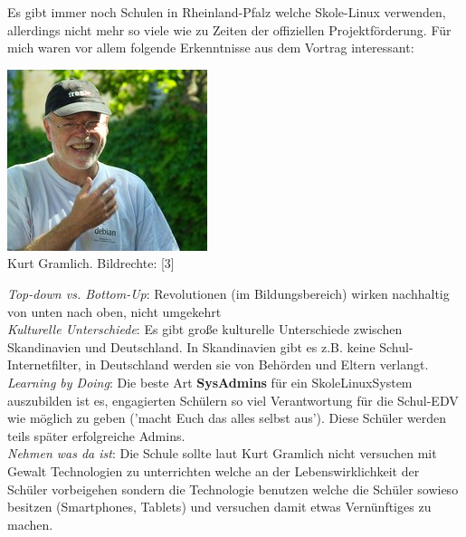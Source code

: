 \documentclass[10pt,a4paper,ngerman,twoside]{article} %
\begin{document}
\begin{multicols}{3}
Es gibt immer noch Schulen in Rheinland-Pfalz welche Skole-Linux verwenden, allerdings nicht mehr so viele wie zu Zeiten der offiziellen Projektförderung. Für mich waren vor allem folgende Erkenntnisse aus dem Vortrag interessant:

\begin{center}
\includegraphics[width=\linewidth]{chemnitz/chemnitz-kurt.jpg} \\
\footnotesize{Kurt Gramlich. Bildrechte: [3]}
\end{center}

\textit{Top-down vs. Bottom-Up}: Revolutionen (im Bildungsbereich) wirken nachhaltig von unten nach oben, nicht umgekehrt \\

\textit{Kulturelle Unterschiede}: Es gibt große kulturelle Unterschiede zwischen Skandinavien und Deutschland. In Skandinavien gibt es z.B. keine Schul-Internetfilter, in Deutschland werden sie von Behörden und Eltern verlangt. \\

\textit{Learning by Doing}: Die beste Art \textbf{SysAdmins} für ein SkoleLinuxSystem auszubilden ist es, engagierten Schülern so viel Verantwortung für die Schul-EDV wie möglich zu geben ('macht Euch das alles selbst aus'). Diese Schüler werden teils später erfolgreiche Admins. \\

\textit{Nehmen was da ist}: Die Schule sollte laut Kurt Gramlich nicht versuchen mit Gewalt Technologien zu unterrichten welche an der Lebenswirklichkeit der Schüler vorbeigehen sondern die Technologie benutzen welche die Schüler sowieso besitzen (Smartphones, Tablets) und versuchen damit etwas Vernünftiges zu machen. \\


\end{multicols}
\end{document}
